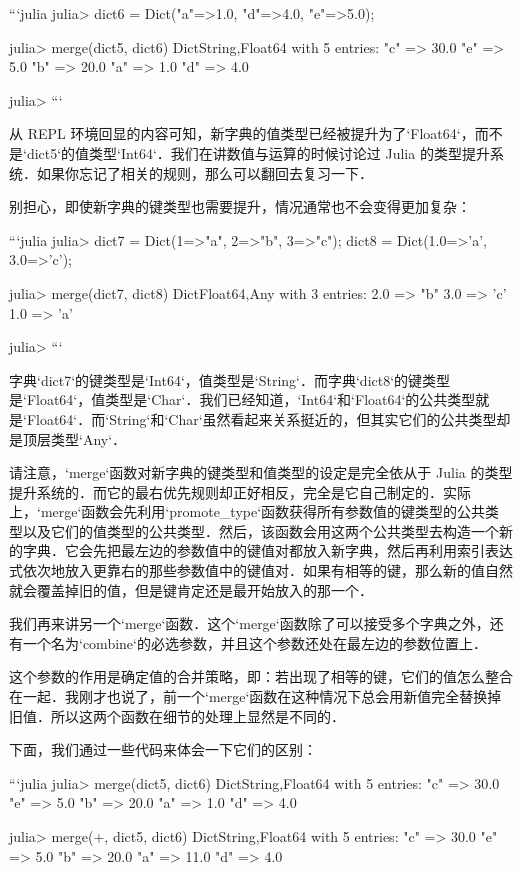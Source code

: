 ```julia
julia> dict6 = Dict("a"=>1.0, "d"=>4.0, "e"=>5.0);

julia> merge(dict5, dict6)
Dict{String,Float64} with 5 entries:
  "c" => 30.0
  "e" => 5.0
  "b" => 20.0
  "a" => 1.0
  "d" => 4.0

julia> 
```

从 REPL 环境回显的内容可知，新字典的值类型已经被提升为了`Float64`，而不是`dict5`的值类型`Int64`．我们在讲数值与运算的时候讨论过 Julia 的类型提升系统．如果你忘记了相关的规则，那么可以翻回去复习一下．

别担心，即使新字典的键类型也需要提升，情况通常也不会变得更加复杂：

```julia
julia> dict7 = Dict(1=>"a", 2=>"b", 3=>"c"); dict8 = Dict(1.0=>'a', 3.0=>'c');

julia> merge(dict7, dict8)
Dict{Float64,Any} with 3 entries:
  2.0 => "b"
  3.0 => 'c'
  1.0 => 'a'

julia> 
```

字典`dict7`的键类型是`Int64`，值类型是`String`．而字典`dict8`的键类型是`Float64`，值类型是`Char`．我们已经知道，`Int64`和`Float64`的公共类型就是`Float64`．而`String`和`Char`虽然看起来关系挺近的，但其实它们的公共类型却是顶层类型`Any`．

请注意，`merge`函数对新字典的键类型和值类型的设定是完全依从于 Julia 的类型提升系统的．而它的最右优先规则却正好相反，完全是它自己制定的．实际上，`merge`函数会先利用`promote_type`函数获得所有参数值的键类型的公共类型以及它们的值类型的公共类型．然后，该函数会用这两个公共类型去构造一个新的字典．它会先把最左边的参数值中的键值对都放入新字典，然后再利用索引表达式依次地放入更靠右的那些参数值中的键值对．如果有相等的键，那么新的值自然就会覆盖掉旧的值，但是键肯定还是最开始放入的那一个．

我们再来讲另一个`merge`函数．这个`merge`函数除了可以接受多个字典之外，还有一个名为`combine`的必选参数，并且这个参数还处在最左边的参数位置上．

这个参数的作用是确定值的合并策略，即：若出现了相等的键，它们的值怎么整合在一起．我刚才也说了，前一个`merge`函数在这种情况下总会用新值完全替换掉旧值．所以这两个函数在细节的处理上显然是不同的．

下面，我们通过一些代码来体会一下它们的区别：

```julia
julia> merge(dict5, dict6)
Dict{String,Float64} with 5 entries:
  "c" => 30.0
  "e" => 5.0
  "b" => 20.0
  "a" => 1.0
  "d" => 4.0

julia> merge(+, dict5, dict6)
Dict{String,Float64} with 5 entries:
  "c" => 30.0
  "e" => 5.0
  "b" => 20.0
  "a" => 11.0
  "d" => 4.0

